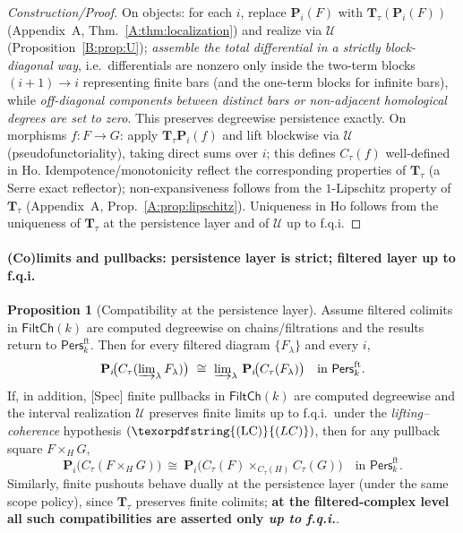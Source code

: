 \documentclass[11pt]{article}
\numberwithin{equation}{section}
\theoremstyle{plain}
\theoremstyle{definition}
\theoremstyle{remark}
\newcommand{\Pers}{\mathsf{Pers}}
\newcommand{\Ho}{\mathrm{Ho}}
\theoremstyle{plain}
\theoremstyle{definition}
\numberwithin{equation}{section}
\newtheorem{proposition}[theorem]{Proposition}
\theoremstyle{definition}
\DeclareRobustCommand{\LC}{\texorpdfstring{\ensuremath{\mathrm{(LC)}}}{(LC)}}
\numberwithin{equation}{section}
\theoremstyle{plain}
\theoremstyle{definition}
\theoremstyle{remark}
\begin{document}
\begin{proof}[Construction/Proof]
On objects: for each \(i\), replace \(\mathbf{P}_i(F)\) with \(\mathbf{T}_\tau(\mathbf{P}_i(F))\) (Appendix~A, Thm.~\ref{A:thm:localization}) and realize via \(\mathcal{U}\) (Proposition~\ref{B:prop:U}); \emph{assemble the total differential in a strictly block-diagonal way}, i.e.\ differentials are nonzero only inside the two-term blocks \((i+1)\to i\) representing finite bars (and the one-term blocks for infinite bars), while \emph{off-diagonal components between distinct bars or non-adjacent homological degrees are set to zero}. This preserves degreewise persistence exactly.
On morphisms \(f:F\to G\): apply \(\mathbf{T}_\tau\mathbf{P}_i(f)\) and lift blockwise via \(\mathcal{U}\) (pseudofunctoriality), taking direct sums over \(i\); this defines \(C_\tau(f)\) well-defined in \(\Ho\).
Idempotence/monotonicity reflect the corresponding properties of \(\mathbf{T}_\tau\) (a Serre exact reflector); non-expansiveness follows from the \(1\)-Lipschitz property of \(\mathbf{T}_\tau\) (Appendix~A, Prop.~\ref{A:prop:lipschitz}).
Uniqueness in \(\Ho\) follows from the uniqueness of \(\mathbf{T}_\tau\) at the persistence layer and of \(\mathcal{U}\) up to f.q.i.
\end{proof}

\paragraph*{(Co)limits and pullbacks: persistence layer is strict; filtered layer up to f.q.i.}
\begin{proposition}[Compatibility at the persistence layer]\label{B:prop:limits}
Assume filtered colimits in \(\mathsf{FiltCh}(k)\) are computed degreewise on chains/filtrations and the results return to \(\Pers^{\mathrm{ft}}_k\).
Then for every filtered diagram \(\{F_\lambda\}\) and every \(i\),
\[
\mathbf{P}_i\!\big(C_\tau(\varinjlim\nolimits_\lambda F_\lambda)\big)\ \cong\ \varinjlim\nolimits_\lambda\, \mathbf{P}_i\!\big(C_\tau(F_\lambda)\big)\quad\text{in } \Pers^{\mathrm{ft}}_k.
\]
If, in addition, \textup{[Spec]} finite pullbacks in \(\mathsf{FiltCh}(k)\) are computed degreewise and the interval realization \(\mathcal{U}\) preserves finite limits up to f.q.i.\ under the \emph{lifting–coherence} hypothesis \((\LC)\), then for any pullback square \(F\times_H G\),
\[
\mathbf{P}_i\!\big(C_\tau(F\times_H G)\big)\ \cong\ \mathbf{P}_i\!\big(C_\tau(F)\times_{C_\tau(H)} C_\tau(G)\big)\quad\text{in } \Pers^{\mathrm{ft}}_k.
\]
Similarly, finite pushouts behave dually at the persistence layer (under the same scope policy), since \(\mathbf{T}_\tau\) preserves finite colimits; \textbf{at the filtered-complex level all such compatibilities are asserted only \emph{up to f.q.i.}}.
\end{proposition}
\end{document}
